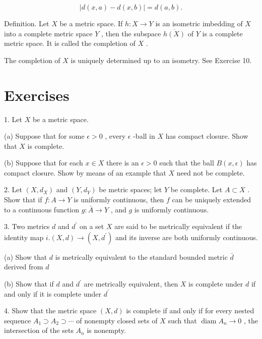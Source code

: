 \documentclass[10pt]{article}
\begin{document}
\[
\left| {d\left( {x,a}\right)  - d\left( {x,b}\right) }\right|  = d\left( {a,b}\right) .
\]

Definition. Let \(X\) be a metric space. If \(h : X \rightarrow  Y\) is an isometric imbedding of \(X\) into a complete metric space \(Y\) , then the subspace \(\overline{h\left( X\right) }\) of \(Y\) is a complete metric space. It is called the completion of \(X\) .

The completion of \(X\) is uniquely determined up to an isometry. See Exercise 10.

\section*{Exercises}

1. Let \(X\) be a metric space.

(a) Suppose that for some \(\epsilon  > 0\) , every \(\epsilon\) -ball in \(X\) has compact closure. Show that \(X\) is complete.

(b) Suppose that for each \(x \in  X\) there is an \(\epsilon  > 0\) such that the ball \(B\left( {x,\epsilon }\right)\) has compact closure. Show by means of an example that \(X\) need not be complete.

2. Let \(\left( {X,{d}_{X}}\right)\) and \(\left( {Y,{d}_{Y}}\right)\) be metric spaces; let \(Y\) be complete. Let \(A \subset  X\) . Show that if \(f : A \rightarrow  Y\) is uniformly continuous, then \(f\) can be uniquely extended to a continuous function \(g : \bar{A} \rightarrow  Y\) , and \(g\) is uniformly continuous.

3. Two metrics \(d\) and \({d}^{\prime }\) on a set \(X\) are said to be metrically equivalent if the identity map \(i.\left( {X,d}\right)  \rightarrow  \left( {X,{d}^{\prime }}\right)\) and its inverse are both uniformly continuous.

(a) Show that \(d\) is metrically equivalent to the standard bounded metric \(\bar{d}\) derived from \(d\)

(b) Show that if \(d\) and \({d}^{\prime }\) are metrically equivalent, then \(X\) is complete under \(d\) if and only if it is complete under \({d}^{\prime }\)

4. Show that the metric space \(\left( {X,d}\right)\) is complete if and only if for every nested sequence \({A}_{1} \supset  {A}_{2} \supset  \cdots\) of nonempty closed sets of \(X\) such that \(\operatorname{diam}{A}_{n} \rightarrow  0\) , the intersection of the sets \({A}_{n}\) is nonempty.
\end{document}
